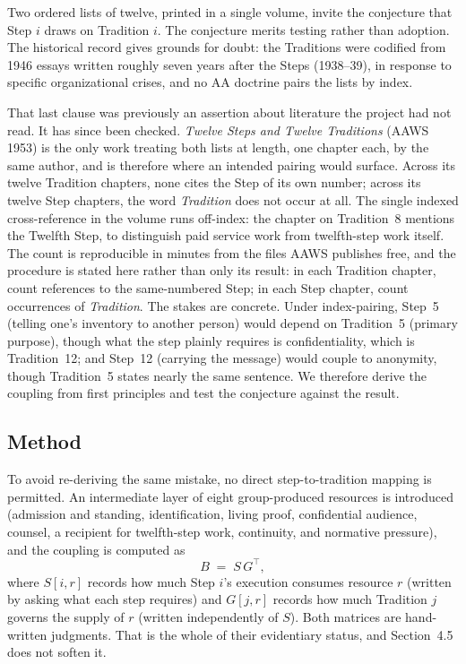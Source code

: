 \documentclass[11pt,a4paper]{article}
\begin{document}
\label{sec:conjecture}
Two ordered lists of twelve, printed in a single volume, invite the conjecture
that Step $i$ draws on Tradition $i$. The conjecture merits testing rather than
adoption. The historical record gives grounds for doubt: the Traditions were
codified from 1946 essays written roughly seven years after the Steps (1938--39), in response to
specific organizational crises, and no AA doctrine pairs the lists by index.

That last clause was previously an assertion about literature the project had not
read. It has since been checked. \textit{Twelve Steps and Twelve Traditions}
(AAWS 1953) is the only work treating both lists at length, one chapter each, by
the same author, and is therefore where an intended pairing would surface. Across
its twelve Tradition chapters, none cites the Step of its own number; across its
twelve Step chapters, the word \emph{Tradition} does not occur at all. The single
indexed cross-reference in the volume runs off-index: the chapter on Tradition~8
mentions the Twelfth Step, to distinguish paid service work from twelfth-step work
itself. The count is reproducible in minutes from the files AAWS publishes free,
and the procedure is stated here rather than only its result: in each Tradition
chapter, count references to the same-numbered Step; in each Step chapter, count
occurrences of \emph{Tradition}. The
stakes are concrete. Under index-pairing, Step~5 (telling one's inventory to
another person) would depend on Tradition~5 (primary purpose), though what the
step plainly requires is confidentiality, which is Tradition~12; and Step~12
(carrying the message) would couple to anonymity, though Tradition~5 states nearly
the same sentence. We therefore derive the coupling from first principles and test
the conjecture against the result.

\subsection{Method}

To avoid re-deriving the same mistake, no direct step-to-tradition mapping is
permitted. An intermediate layer of eight group-produced resources is introduced
(admission and standing, identification, living proof, confidential audience,
counsel, a recipient for twelfth-step work, continuity, and normative pressure),
and the coupling is computed as
\begin{equation}
B \;=\; S\,G^{\top},
\end{equation}
where $S[i,r]$ records how much Step $i$'s execution consumes resource $r$
(written by asking what each step requires) and $G[j,r]$ records how much
Tradition $j$ governs the supply of $r$ (written independently of $S$). Both
matrices are hand-written judgments. That is the whole of their evidentiary
status, and Section~4.5 does not soften it.
\end{document}
